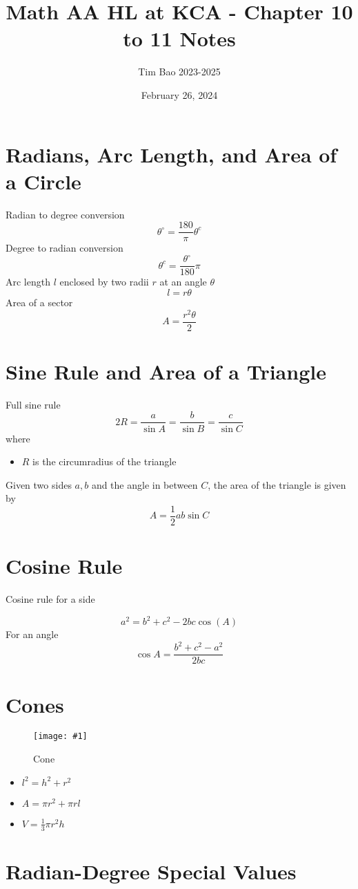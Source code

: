\documentclass[11pt]{article}
\title{Math AA HL at KCA - Chapter 10 to 11 Notes}
\author{Tim Bao 2023-2025}
\date{February 26, 2024}
\newcommand{\degsym}{^{\circ}}
\newcommand{\img}[3]{\begin{center}
  \begin{figure}[H]
    \centering
    \texttt{[image: \#1]}
    \caption{#3}
    \label{fig:fig1}
  \end{figure}
\end{center}}
\begin{document}
\maketitle
\pagebreak
\tableofcontents
\pagebreak

\section{Radians, Arc Length, and Area of a Circle}
Radian to degree conversion
$$\theta \degsym = \frac{180}{\pi}\theta^c$$
Degree to radian conversion
$$\theta^c = \frac{\theta\degsym}{180}\pi$$
Arc length $l$ enclosed by two radii $r$ at an angle $\theta$
$$l = r\theta$$
Area of a sector $$A = \frac{r^2\theta}{2}$$

\section{Sine Rule and Area of a Triangle}

Full sine rule $$2R = \frac{a}{\sin A} = \frac{b}{\sin B} = \frac{c}{\sin C}$$
where
\begin{itemize}
  \item $R$ is the circumradius of the triangle
\end{itemize}

\noindent Given two sides $a, b$ and the angle in between $C$, the area of the triangle is given by $$A = \frac{1}{2}ab\sin C$$

\section{Cosine Rule}

Cosine rule for a side

$$a^2 = b^2 + c^2 - 2bc\cos(A)$$
For an angle
$$\cos A = \frac{b^2 + c^2 - a^2}{2bc}$$

\section{Cones}

\img{cone.png}{0.4}{Cone}

\begin{itemize}
  \item $l^2 = h^2 + r^2$
  \item $A = \pi r^2 + \pi r l$
  \item $V = \frac{1}{3}\pi r^2h$
\end{itemize}

\section{Radian-Degree Special Values}
\end{document}
